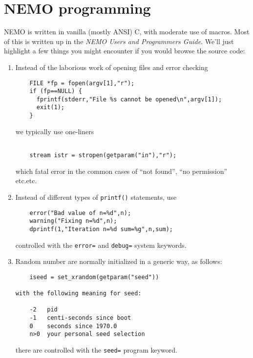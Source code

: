 \chapter                {NEMO programming}

NEMO is written in vanilla (mostly ANSI) C, with moderate use of
macros. Most of this is written up in the 
{\it NEMO Users and Programmers Guide}. We'll just highlight a few 
things you might encounter if you would browse the source code:

\begin{enumerate}

\item
Instead of the laborious work of opening files and error checking

\footnotesize\begin{verbatim}
    FILE *fp = fopen(argv[1],"r");
    if (fp==NULL) {
      fprintf(stderr,"File %s cannot be opened\n",argv[1]);
      exit(1);
    }
\end{verbatim}\normalsize

we typically use one-liners
\footnotesize\begin{verbatim}

    stream istr = stropen(getparam("in"),"r");
\end{verbatim}\normalsize
which fatal error in the common cases of ``not found'', ``no permission'' etc.etc.

\item
Instead of different types of {\tt printf()} statements, use
\footnotesize\begin{verbatim}
    error("Bad value of n=%d",n);
    warning("Fixing n=%d",n);
    dprintf(1,"Iteration n=%d sum=%g",n,sum);
\end{verbatim}\normalsize
controlled with the {\tt error=} and {\tt debug=} system keywords.

\item
Random number are normally initialized in a generic way, as follows:
\footnotesize\begin{verbatim}
    iseed = set_xrandom(getparam("seed"))

with the following meaning for seed:

    -2   pid
    -1   centi-seconds since boot
    0    seconds since 1970.0
    n>0  your personal seed selection
\end{verbatim}\normalsize

there are controlled with the  {\tt seed=} program keyword.


\end{enumerate}

